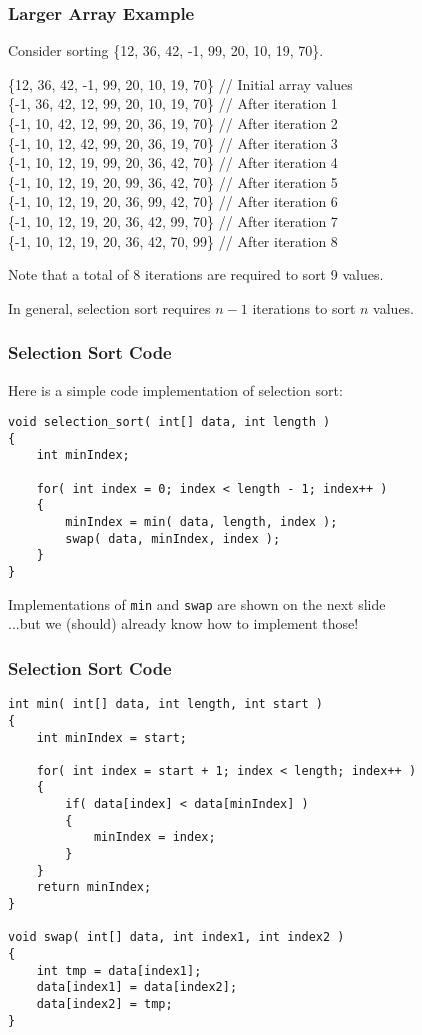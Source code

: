 \begin{frame}
\frametitle{Larger Array Example}

Consider sorting \{12, 36, 42, -1, 99, 20, 10, 19, 70\}.

	\{12, 36, 42, -1, 99, 20, 10, 19, 70\} 	// Initial array values\\
	\{\alert{-1}, 36, 42, 12, 99, 20, 10, 19, 70\}	// After iteration 1\\
	\{\alert{-1, 10}, 42, 12, 99, 20, 36, 19, 70\}	// After iteration 2\\
	\{\alert{-1, 10, 12}, 42, 99, 20, 36, 19, 70\}	// After iteration 3\\
	\{\alert{-1, 10, 12, 19}, 99, 20, 36, 42, 70\}	// After iteration 4\\
	\{\alert{-1, 10, 12, 19, 20}, 99, 36, 42, 70\}	// After iteration 5\\
	\{\alert{-1, 10, 12, 19, 20, 36}, 99, 42, 70\}	// After iteration 6\\
	\{\alert{-1, 10, 12, 19, 20, 36, 42}, 99, 70\}	// After iteration 7\\
	\{\alert{-1, 10, 12, 19, 20, 36, 42, 70, 99}\}	// After iteration 8

Note that a total of 8 iterations are required to sort 9 values.

In general, selection sort requires $n-1$ iterations to sort $n$ values.


\end{frame}

\begin{frame}[fragile]
\frametitle{Selection Sort Code}

Here is a simple code implementation of selection sort:

\begin{verbatim}
void selection_sort( int[] data, int length )
{
    int minIndex;

    for( int index = 0; index < length - 1; index++ )
    {
        minIndex = min( data, length, index );
        swap( data, minIndex, index );
    }
}
\end{verbatim}

Implementations of \texttt{min} and \texttt{swap} are shown on the next slide\\ \quad ...but we (should) already know how to implement those!

\end{frame}

\begin{frame}[fragile]
\frametitle{Selection Sort Code}

{\scriptsize
\begin{verbatim}
int min( int[] data, int length, int start )
{
    int minIndex = start;
		
    for( int index = start + 1; index < length; index++ )
    {
        if( data[index] < data[minIndex] )
        {
            minIndex = index;
        }
    }
    return minIndex;
}

void swap( int[] data, int index1, int index2 )
{
    int tmp = data[index1];
    data[index1] = data[index2];
    data[index2] = tmp;
}
\end{verbatim}
}
\end{frame}

